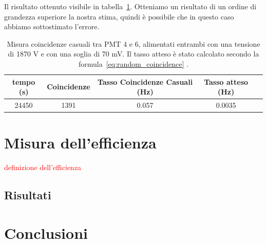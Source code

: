 \documentclass[a4paper,10pt]{article}
\newcommand{\note}[1]{\textcolor{red}{#1}}
\begin{document}
Il risultato ottenuto visibile in tabella~\ref{tab:random_coincidence_mesured}. Otteniamo un risultato di un ordine di grandezza superiore la nostra stima, quindi è possibile che in questo caso abbiamo sottostimato l'errore. 

\begin{table}
\centering
\begin{tabular}{|c|c|c|c|c|}
\hline 
tempo (s) & Coincidenze & Tasso Coincidenze Casuali (Hz) & Tasso atteso (Hz) \\ 
\hline 
24450 & 1391 & 0.057 & 0.0035\\ 
\hline 
\end{tabular} 
\caption{Misura coincidenze casuali tra PMT 4 e 6, alimentati entrambi con una tensione di 1870 V e con una soglia di 70 mV. Il tasso atteso è stato calcolato secondo la formula~\ref{eq:random_coincidence} .}
\label{tab:random_coincidence_mesured}
\end{table}

\section{Misura dell'efficienza}
\note{definizione dell'efficienza}
\subsection{Risultati}
\label{sec:efficienza} 


\section{Conclusioni}

\end{document}

